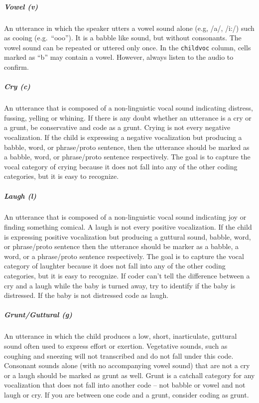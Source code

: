 \documentclass[
  12pt,
]{book}
\begin{document}
\hypertarget{vowel}{%
\subparagraph*{Vowel (v)}\label{vowel}}

An utterance in which the speaker utters a vowel sound alone (e.g, /a/, /i:/) such as cooing (e.g.~``ooo''). It is a babble like sound, but without consonants. The vowel sound can be repeated or uttered only once. In the \texttt{childvoc} column, cells marked as ``b'' may contain a vowel. However, always listen to the audio to confirm.

\hypertarget{cry}{%
\subparagraph*{Cry (c)}\label{cry}}

An utterance that is composed of a non-linguistic vocal sound indicating distress, fussing, yelling or whining. If there is any doubt whether an utterance is a cry or a grunt, be conservative and code as a grunt. Crying is not every negative vocalization. If the child is expressing a negative vocalization but producing a babble, word, or phrase/proto sentence, then the utterance should be marked as a babble, word, or phrase/proto sentence respectively. The goal is to capture the vocal category of crying because it does not fall into any of the other coding categories, but it is easy to recognize.

\hypertarget{laugh}{%
\subparagraph*{Laugh (l)}\label{laugh}}

An utterance that is composed of a non-linguistic vocal sound indicating joy or finding something comical. A laugh is not every positive vocalization. If the child is expressing positive vocalization but producing a guttural sound, babble, word, or phrase/proto sentence then the utterance should be marker as a babble, a word, or a phrase/proto sentence respectively. The goal is to capture the vocal category of laughter because it does not fall into any of the other coding categories, but it is easy to recognize. If coder can't tell the difference between a cry and a laugh while the baby is turned away, try to identify if the baby is distressed. If the baby is not distressed code as laugh.

\hypertarget{grunt_guttural}{%
\subparagraph*{Grunt/Guttural (g)}\label{grunt_guttural}}

An utterance in which the child produces a low, short, inarticulate, guttural sound often used to express effort or exertion. Vegetative sounds, such as coughing and sneezing will not transcribed and do not fall under this code. Consonant sounds alone (with no accompanying vowel sound) that are not a cry or a laugh should be marked as grunt as well. Grunt is a catchall category for any vocalization that does not fall into another code -- not babble or vowel and not laugh or cry. If you are between one code and a grunt, consider coding as grunt.
\end{document}
